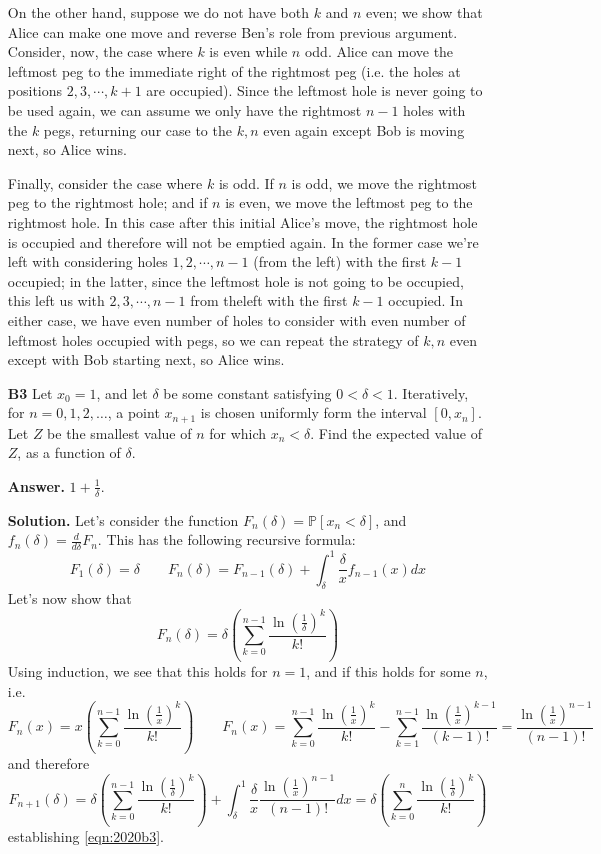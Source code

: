 \documentclass[11pt,a4paper]{article}
\newcommand{\bbP}{\mathbb P}
\newcommand{\<}{\langle}
\renewcommand{\>}{\rangle}
\begin{document}
\begin{enumerate}
    On the other hand, suppose we do not have both $k$ and $n$ even; 
    we show that Alice can make one move and reverse Ben's role from previous argument. 
    Consider, now, the case where $k$ is even while $n$ odd. 
    Alice can move the leftmost peg to the immediate right of the rightmost peg 
    (i.e. the holes at positions $2, 3, \cdots, k+1$ are occupied). 
    Since the leftmost hole is never going to be used again, 
    we can assume we only have the rightmost $n - 1$ holes with the $k$ pegs, 
    returning our case to the $k, n$ even again except Bob is moving next, so Alice wins. 
    
    Finally, consider the case where $k$ is odd. 
    If $n$ is odd, we move the rightmost peg to the rightmost hole; 
    and if $n$ is even, we move the leftmost peg to the rightmost hole. 
    In this case after this initial Alice's move, the rightmost hole is occupied and therefore will not be emptied again. 
    In the former case we're left with considering holes $1, 2, \cdots, n - 1$ (from the left) with the first $k - 1$ occupied; 
    in the latter, since the leftmost hole is not going to be occupied, 
    this left us with $2, 3, \cdots, n-1$ from theleft with the first $k - 1$ occupied. 
    In either case, we have even number of holes to consider with even number of leftmost holes occupied with pegs, 
    so we can repeat the strategy of $k, n$ even except with Bob starting next, so Alice wins. 
	
	\item [\textbf{B3}] Let $x_0=1$, and let $\delta$ be some constant satisfying $0<\delta<1$. Iteratively, for $n=0,1,2,\dots$, a point $x_{n+1}$ is chosen uniformly form the interval $[0,x_n]$. Let $Z$ be the smallest value of $n$ for which $x_n<\delta$. Find the expected value of $Z$, as a function of $\delta$.
	
	\textbf{Answer.} $1+\frac{1}{\delta}$. 
	
	\textbf{Solution.} 
	Let's consider the function $F_n(\delta)=\bbP[x_n<\delta]$, and $f_n(\delta)=\frac{d}{d\delta}F_n$. 
	This has the following recursive formula: 
	\[
	F_1(\delta)=\delta 
	\qquad 
	F_n(\delta) = F_{n-1}(\delta) + \int_{\delta}^1 \frac{\delta}{x} f_{n-1}(x)dx
	\]
	Let's now show that 
	\begin{equation}\label{eqn:2020b3}
	  F_n(\delta)=\delta\left(\sum_{k=0}^{n-1}\frac{\ln (\frac{1}{\delta})^k}{k!}\right)
	\end{equation}
	Using induction, we see that this holds for $n=1$, and if this holds for some $n$, i.e. 
	\[
	F_n(x)=x\left(\sum_{k=0}^{n-1}\frac{\ln (\frac{1}{x})^k}{k!}\right)
	\qquad 
	F_n(x) = \sum_{k=0}^{n-1}\frac{\ln (\frac{1}{x})^k}{k!} - \sum_{k=1}^{n-1}\frac{\ln (\frac{1}{x})^{k-1}}{(k-1)!}
	=\frac{\ln (\frac{1}{x})^{n-1}}{(n-1)!}
	\]
	and therefore 
	\[
	F_{n+1}(\delta)=
	\delta\left(\sum_{k=0}^{n-1}\frac{\ln (\frac{1}{\delta})^k}{k!}\right)
	+\int_{\delta}^1 \frac{\delta}{x} \frac{\ln (\frac{1}{x})^{n-1}}{(n-1)!}dx
	=\delta\left(\sum_{k=0}^{n}\frac{\ln (\frac{1}{\delta})^k}{k!}\right)
	\]
	establishing \ref{eqn:2020b3}. 
	

\end{enumerate}
\end{document}
